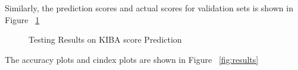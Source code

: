 Similarly, the prediction scores and actual scores for validation sets is shown in Figure ~\ref{fig:val_train}
\begin{figure}[h]
    \caption{Testing Results on KIBA score Prediction}
    \label{fig:val_train}
\end{figure}

\iffalse
The accuracy plots and cindex plots are shown in Figure ~\ref{fig:results}
\begin{figure}
    
\end{figure}

